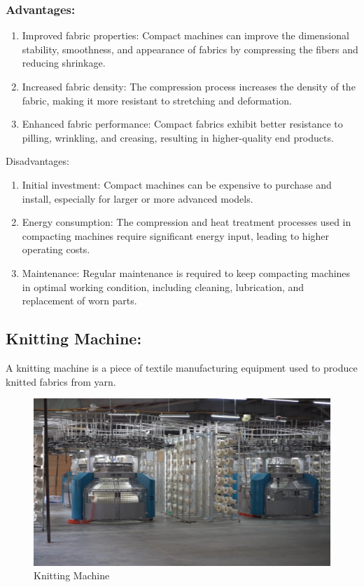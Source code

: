 \subsubsection{Advantages:}

\begin{enumerate}
\item
  Improved fabric properties: Compact machines can improve the
  dimensional stability, smoothness, and appearance of fabrics by
  compressing the fibers and reducing shrinkage.
\item
  Increased fabric density: The compression process increases the
  density of the fabric, making it more resistant to stretching and
  deformation.
\item
  Enhanced fabric performance: Compact fabrics exhibit better resistance
  to pilling, wrinkling, and creasing, resulting in higher-quality end
  products.
\end{enumerate}


Disadvantages:


\begin{enumerate}
\item
  Initial investment: Compact machines can be expensive to purchase and
  install, especially for larger or more advanced models.
\item
  Energy consumption: The compression and heat treatment processes used
  in compacting machines require significant energy input, leading to
  higher operating costs.
\item
  Maintenance: Regular maintenance is required to keep compacting
  machines in optimal working condition, including cleaning,
  lubrication, and replacement of worn parts.
\end{enumerate}

\subsection{Knitting Machine:}


A knitting machine is a piece of textile manufacturing equipment used to
produce knitted fabrics from yarn.

\begin{figure}[h!]
  \centering
  \includegraphics[width=0.8\linewidth]{figs/knitting.jpg}
  \caption{Knitting Machine}
  \label{fig:Knitting Machine}
\end{figure}

